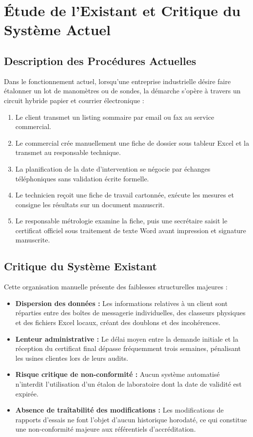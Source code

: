 \documentclass{bts-report}
\begin{document}
\section{\'Etude de l'Existant et Critique du Syst\`eme Actuel}
\subsection{Description des Proc\'edures Actuelles}
Dans le fonctionnement actuel, lorsqu'une entreprise industrielle d\'esire faire \'etalonner un lot de manom\`etres ou de sondes, la d\'emarche s'op\`ere \`a travers un circuit hybride papier et courrier \'electronique :
\begin{enumerate}
  \item Le client transmet un listing sommaire par email ou fax au service commercial.
  \item Le commercial cr\'ee manuellement une fiche de dossier sous tableur Excel et la transmet au responsable technique.
  \item La planification de la date d'intervention se n\'egocie par \'echanges t\'el\'ephoniques sans validation \'ecrite formelle.
  \item Le technicien re\c{c}oit une fiche de travail cartonn\'ee, ex\'ecute les mesures et consigne les r\'esultats sur un document manuscrit.
  \item Le responsable m\'etrologie examine la fiche, puis une secr\'etaire saisit le certificat officiel sous traitement de texte Word avant impression et signature manuscrite.
\end{enumerate}

\subsection{Critique du Syst\`eme Existant}
Cette organisation manuelle pr\'esente des faiblesses structurelles majeures :
\begin{itemize}
  \item \textbf{Dispersion des donn\'ees :} Les informations relatives \`a un client sont r\'eparties entre des bo\^ites de messagerie individuelles, des classeurs physiques et des fichiers Excel locaux, cr\'eant des doublons et des incoh\'erences.
  \item \textbf{Lenteur administrative :} Le d\'elai moyen entre la demande initiale et la r\'eception du certificat final d\'epasse fr\'equemment trois semaines, p\'enalisant les usines clientes lors de leurs audits.
  \item \textbf{Risque critique de non-conformit\'e :} Aucun syst\`eme automatis\'e n'interdit l'utilisation d'un \'etalon de laboratoire dont la date de validit\'e est expir\'ee.
  \item \textbf{Absence de tra\^itabilit\'e des modifications :} Les modifications de rapports d'essais ne font l'objet d'aucun historique horodat\'e, ce qui constitue une non-conformit\'e majeure aux r\'ef\'erentiels d'accr\'editation.
\end{itemize}
\end{document}
